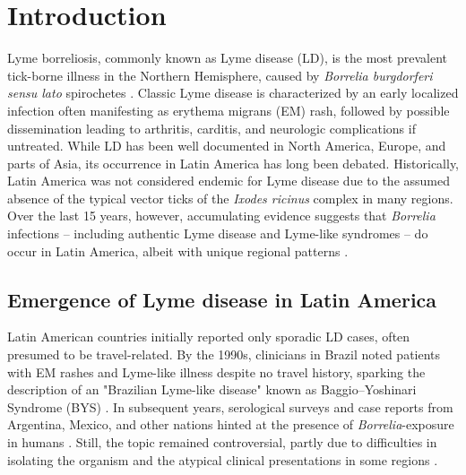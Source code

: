 \documentclass[11pt,letterpaper]{article}
\begin{document}
\doublespacing

\section{Introduction}
Lyme borreliosis, commonly known as Lyme disease (LD), is the most prevalent tick-borne illness in the Northern Hemisphere, caused by \textit{Borrelia burgdorferi sensu lato} spirochetes \citep{Binetruy2020}. Classic Lyme disease is characterized by an early localized infection often manifesting as erythema migrans (EM) rash, followed by possible dissemination leading to arthritis, carditis, and neurologic complications if untreated. While LD has been well documented in North America, Europe, and parts of Asia, its occurrence in Latin America has long been debated. Historically, Latin America was not considered endemic for Lyme disease due to the assumed absence of the typical vector ticks of the \textit{Ixodes ricinus} complex in many regions. Over the last 15 years, however, accumulating evidence suggests that \textit{Borrelia} infections – including authentic Lyme disease and Lyme-like syndromes – do occur in Latin America, albeit with unique regional patterns \citep{Lucca2024, Lucca2024a}.

\subsection{Emergence of Lyme disease in Latin America}
Latin American countries initially reported only sporadic LD cases, often presumed to be travel-related. By the 1990s, clinicians in Brazil noted patients with EM rashes and Lyme-like illness despite no travel history, sparking the description of an "Brazilian Lyme-like disease" known as Baggio–Yoshinari Syndrome (BYS) \citep{Yoshinari2022, Yoshinari2022a}. In subsequent years, serological surveys and case reports from Argentina, Mexico, and other nations hinted at the presence of \textit{Borrelia}-exposure in humans \citep{Lucca2024, Colunga-Salas2020}. Still, the topic remained controversial, partly due to difficulties in isolating the organism and the atypical clinical presentations in some regions \citep{Yoshinari2022b, Yoshinari2022c}.
\end{document}
